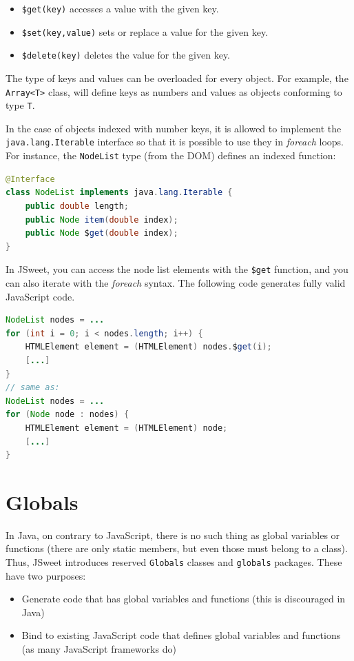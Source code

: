 \documentclass[a4paper]{report}
\begin{document}
\begin{itemize}
\item \texttt{\$get(key)} accesses a value with the given key.
\item \texttt{\$set(key,value)} sets or replace a value for the given key.
\item \texttt{\$delete(key)} deletes the value for the given key.
\end{itemize}

The type of keys and values can be overloaded for every object. For example, the \texttt{Array<T>} class, will define keys as numbers and values as objects conforming to type \texttt{T}.

In the case of objects indexed with number keys, it is allowed to implement the \texttt{java.lang.Iterable} interface so that it is possible to use they in \emph{foreach} loops. For instance, the \texttt{NodeList} type (from the DOM) defines an indexed function:

\begin{lstlisting}[language=Java]
@Interface
class NodeList implements java.lang.Iterable {
    public double length;
    public Node item(double index);
    public Node $get(double index);
}
\end{lstlisting}

In JSweet, you can access the node list elements with the \texttt{\$get} function, and you can also iterate with the \emph{foreach} syntax. The following code generates fully valid JavaScript code.

\begin{lstlisting}[language=Java]
NodeList nodes = ...
for (int i = 0; i < nodes.length; i++) {
	HTMLElement element = (HTMLElement) nodes.$get(i);
	[...]
}
// same as:
NodeList nodes = ...
for (Node node : nodes) {
	HTMLElement element = (HTMLElement) node;
	[...]
}
\end{lstlisting}

\section{Globals}

In Java, on contrary to JavaScript, there is no such thing as global variables or functions (there are only static members, but even those must belong to a class). Thus, JSweet introduces reserved \texttt{Globals} classes and \texttt{globals} packages. These have two purposes:

\begin{itemize}
\item Generate code that has global variables and functions (this is discouraged in Java)
\item Bind to existing JavaScript code that defines global variables and functions (as many JavaScript frameworks do)
\end{itemize}
\end{document}
